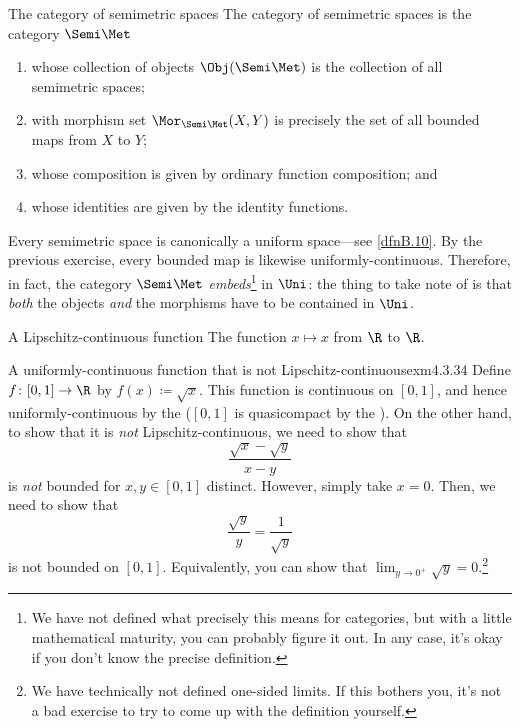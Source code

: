 \begin{exm}{The category of semimetric spaces}{}
The category of semimetric spaces is the category $\Semi \Met$\index[notation]{$\Semi \Met$}
\begin{enumerate}
\item whose collection of objects $\Obj (\Semi \Met )$ is the collection of all semimetric spaces;
\item with morphism set $\Mor _{\Semi \Met}(X,Y)$ is precisely the set of all bounded maps from $X$ to $Y$;
\item whose composition is given by ordinary function composition; and
\item whose identities are given by the identity functions.
\end{enumerate}
\begin{rmk}
Every semimetric space is canonically a uniform space---see \cref{dfnB.10}.  By the previous exercise, every bounded map is likewise uniformly-continuous.  Therefore, in fact, the category $\Semi \Met$ \emph{embeds}\footnote{We have not defined what precisely this means for categories, but with a little mathematical maturity, you can probably figure it out.  In any case, it's okay if you don't know the precise definition.} in $\Uni$:  the thing to take note of is that \emph{both} the objects \emph{and} the morphisms have to be contained in $\Uni$.
\end{rmk}
\end{exm}
\begin{exm}{A Lipschitz-continuous function}{}
The function $x\mapsto x$ from $\R$ to $\R$.
\end{exm}
\begin{exm}{A uniformly-continuous function that is not Lipschitz-continuous}{exm4.3.34}
Define $f\colon [0,1]\rightarrow \R$ by $f(x)\coloneqq \sqrt{x}$.  This function is continuous on $[0,1]$, and hence uniformly-continuous by the  ($[0,1]$ is quasicompact by the ).  On the other hand, to show that it is \emph{not} Lipschitz-continuous, we need to show that
\begin{equation}
\frac{\sqrt{x}-\sqrt{y}}{x-y}
\end{equation}
is \emph{not} bounded for $x,y\in [0,1]$ distinct.  However, simply take $x=0$.  Then, we need to show that
\begin{equation}
\frac{\sqrt{y}}{y}=\frac{1}{\sqrt{y}}
\end{equation}
is not bounded on $[0,1]$.  Equivalently, you can show that $\lim _{y\to 0^+}\sqrt{y}=0$.\footnote{We have technically not defined one-sided limits.  If this bothers you, it's not a bad exercise to try to come up with the definition yourself.}
\end{exm}

